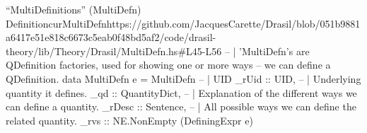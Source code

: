 \begin{haskell}{``MultiDefinitions'' (MultiDefn) Definition}{curMultiDefn}{https://github.com/JacquesCarette/Drasil/blob/051b9881a6417e51e818c6673c5eab0f48bd5af2/code/drasil-theory/lib/Theory/Drasil/MultiDefn.hs\#L45-L56}
-- | 'MultiDefn's are QDefinition factories, used for showing one or more ways
--   we can define a QDefinition.
data MultiDefn e = MultiDefn{
  -- | UID
  _rUid :: UID,
  -- | Underlying quantity it defines.
  _qd :: QuantityDict,
  -- | Explanation of the different ways we can define a quantity.
  _rDesc :: Sentence,
  -- | All possible ways we can define the related quantity.
  _rvs :: NE.NonEmpty (DefiningExpr e)
}
\end{haskell}
